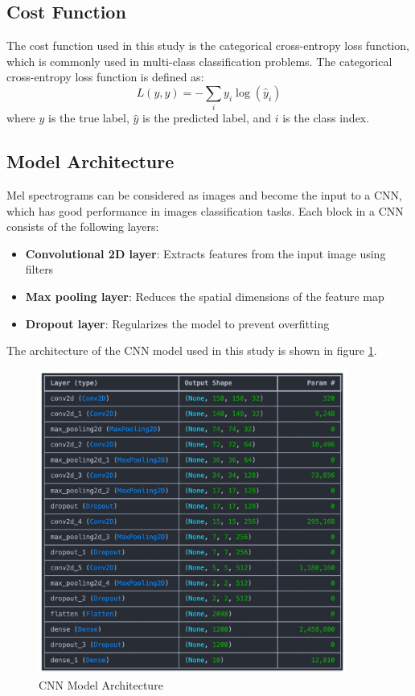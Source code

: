 \documentclass[11.5pt]{article}
\begin{document}
\subsection{Cost Function}
The cost function used in this study is the categorical cross-entropy loss function, which is commonly used in multi-class classification problems. The categorical cross-entropy loss function is defined as:
\begin{equation}
    L(y, \hat{y}) = -\sum_{i} y_i \log(\hat{y}_i)
\end{equation}
where $y$ is the true label, $\hat{y}$ is the predicted label, and $i$ is the class index.

\subsection{Model Architecture}
Mel spectrograms can be considered as images and become the input to a CNN, which has good performance in images classification tasks. Each block in a CNN consists of the following layers:
\begin{itemize}
    \item \textbf{Convolutional 2D layer}: Extracts features from the input image using filters
    \item \textbf{Max pooling layer}: Reduces the spatial dimensions of the feature map
    \item \textbf{Dropout layer}: Regularizes the model to prevent overfitting
\end{itemize}

The architecture of the CNN model used in this study is shown in figure \ref{fig:cnn_architecture}.
\begin{figure}[H]
    \centering
    \includegraphics[width=0.9\textwidth]{graphics/model_architecture.jpg}
    \caption{CNN Model Architecture}
    \label{fig:cnn_architecture}
\end{figure}
\end{document}
